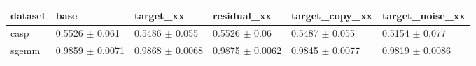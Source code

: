 \begin{tabular}{llllll}
\toprule
dataset & base & target\_xx & residual\_xx & target\_copy\_xx & target\_noise\_xx \\
\midrule
casp & 0.5526 $\pm$ 0.061 & 0.5486 $\pm$ 0.055 & 0.5526 $\pm$ 0.06 & 0.5487 $\pm$ 0.055 & 0.5154 $\pm$ 0.077 \\
sgemm & 0.9859 $\pm$ 0.0071 & 0.9868 $\pm$ 0.0068 & 0.9875 $\pm$ 0.0062 & 0.9845 $\pm$ 0.0077 & 0.9819 $\pm$ 0.0086 \\
\bottomrule
\end{tabular}
